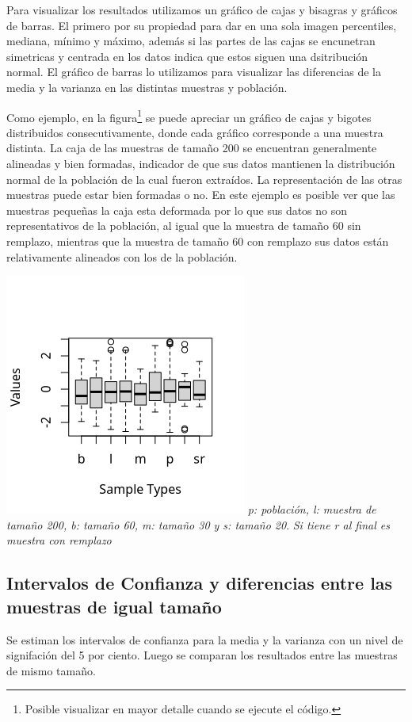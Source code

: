 \documentclass[10pt,twocolumn,a4paper]{article}
\begin{document}
Para visualizar los resultados utilizamos un gr\'afico de cajas y bisagras y gr\'aficos de barras. El primero por su propiedad para dar en una sola imagen percentiles, mediana, m\'inimo y m\'aximo, adem\'as si las partes de las cajas se encunetran simetricas y centrada en los datos indica que estos siguen una dsitribuci\'on normal. El gr\'afico de barras lo utilizamos para visualizar las diferencias de la media y la varianza en las distintas muestras y poblaci\'on.

Como ejemplo, en la figura\footnote{Posible visualizar en mayor detalle cuando se ejecute el c\'odigo.} se puede apreciar un gr\'afico de cajas y bigotes distribuidos consecutivamente, donde cada gr\'afico corresponde a una muestra distinta. La caja de las muestras de tama\~no 200 se encuentran generalmente alineadas y bien formadas, indicador de que sus datos mantienen la distribución normal de la poblaci\'on de la cual fueron extra\'idos.
La representaci\'on de las otras muestras puede estar bien formadas o no.
En este ejemplo es posible ver que las muestras peque\~nas la caja esta deformada por lo que sus datos no son representativos de la poblaci\'on,
al igual que la muestra de tamaño 60 sin remplazo, mientras que la muestra de tama\~no 60 con remplazo sus datos est\'an relativamente alineados con los de la poblaci\'on.

\includegraphics{images/ex1_box_300.png}
\textit{p: poblaci\'on, l: muestra de tama\~no 200, b: tama\~no 60, m: tama\~no 30 y s: tama\~no 20}.
\textit{Si tiene r al final es muestra con remplazo}

\subsection*{Intervalos de Confianza y diferencias entre las muestras de igual tama\~no}
Se estiman los intervalos de confianza para la media y la varianza con un nivel de signifaci\'on del 5 por ciento. Luego se comparan los resultados entre las muestras de mismo tamaño.
\end{document}
